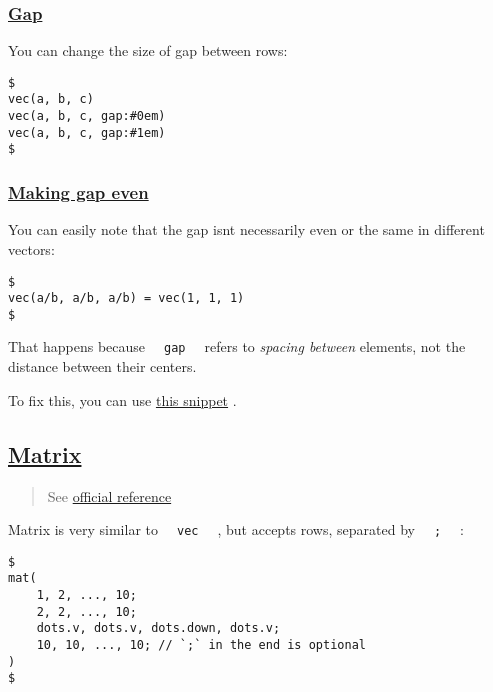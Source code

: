 \subsubsection{\texorpdfstring{\hyperref[gap]{Gap}}{Gap}}\label{gap}

You can change the size of gap between rows:

\begin{verbatim}
$
vec(a, b, c)
vec(a, b, c, gap:#0em)
vec(a, b, c, gap:#1em)
$
\end{verbatim}

\pandocbounded{}

\subsubsection{\texorpdfstring{\hyperref[making-gap-even]{Making gap
even}}{Making gap even}}\label{making-gap-even}

You can easily note that the gap isn\textquotesingle t necessarily even
or the same in different vectors:

\begin{verbatim}
$
vec(a/b, a/b, a/b) = vec(1, 1, 1)
$
\end{verbatim}

\pandocbounded{}

That happens because \texttt{\ }{\texttt{\ gap\ }}\texttt{\ } refers to
\emph{spacing between} elements, not the distance between their centers.

To fix this, you can use \href{../../snippets/math/vecs.html}{this
snippet} .

\subsection{\texorpdfstring{\hyperref[matrix]{Matrix}}{Matrix}}\label{matrix}

\begin{quote}
See \href{https://typst.app/docs/reference/math/mat/}{official
reference}
\end{quote}

Matrix is very similar to \texttt{\ }{\texttt{\ vec\ }}\texttt{\ } , but
accepts rows, separated by \texttt{\ }{\texttt{\ ;\ }}\texttt{\ } :

\begin{verbatim}
$
mat(
    1, 2, ..., 10;
    2, 2, ..., 10;
    dots.v, dots.v, dots.down, dots.v;
    10, 10, ..., 10; // `;` in the end is optional
)
$
\end{verbatim}

